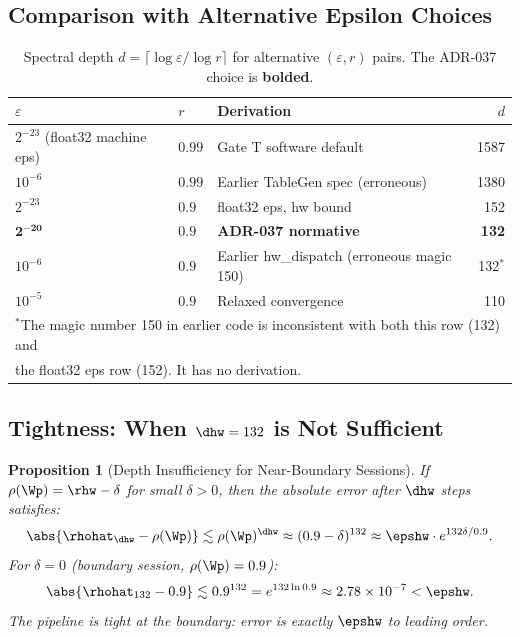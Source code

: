 \documentclass[12pt,letterpaper]{article}
\theoremstyle{plain}
\newtheorem{proposition}[theorem]{Proposition}
\theoremstyle{definition}
\theoremstyle{remark}
\begin{document}
\subsection{Comparison with Alternative Epsilon Choices}

\begin{table}[H]
\centering
\caption{Spectral depth \(d = \lceil \log\varepsilon / \log r \rceil\)
for alternative \((\varepsilon, r)\) pairs.
The ADR-037 choice is \textbf{bolded}.}
\label{tab:depth-compare}
\begin{tabular}{lllr}
\toprule
\(\varepsilon\) & \(r\) & Derivation & \(d\) \\
\midrule
\(2^{-23}\) (float32 machine eps) & \(0.99\) & Gate T software default & 1587 \\
\(10^{-6}\) & \(0.99\) & Earlier TableGen spec (erroneous) & 1380 \\
\(2^{-23}\) & \(0.9\) & float32 eps, hw bound & 152 \\
\(\mathbf{2^{-20}}\) & \(\mathbf{0.9}\) & \textbf{ADR-037 normative} & \textbf{132} \\
\(10^{-6}\) & \(0.9\) & Earlier hw\_dispatch (erroneous magic 150) & 132$^*$ \\
\(10^{-5}\) & \(0.9\) & Relaxed convergence & 110 \\
\bottomrule
\multicolumn{4}{l}{$^*$The magic number 150 in earlier code is inconsistent with both this row (132) and} \\
\multicolumn{4}{l}{\phantom{$^*$}the float32 eps row (152). It has no derivation.}
\end{tabular}
\end{table}

\subsection{Tightness: When \(\dhw = 132\) is Not Sufficient}

\begin{proposition}[Depth Insufficiency for Near-Boundary Sessions]
\label{prop:tightness}
If \(\rho(\Wp) = \rhw - \delta\) for small \(\delta > 0\), then the
absolute error after \(\dhw\) steps satisfies:
\[
  \abs{\rhohat_{\dhw} - \rho(\Wp)} \lesssim \rho(\Wp)^{\dhw}
  \approx (0.9 - \delta)^{132} \approx \epshw \cdot e^{132\delta/0.9}.
\]
For \(\delta = 0\) (boundary session, \(\rho(\Wp) = 0.9\)):
\[
  \abs{\rhohat_{132} - 0.9} \lesssim 0.9^{132} = e^{132\ln 0.9}
  \approx 2.78 \times 10^{-7} < \epshw.
\]
The pipeline is tight at the boundary: error is exactly \(\epshw\) to
leading order.
\end{proposition}
\end{document}

